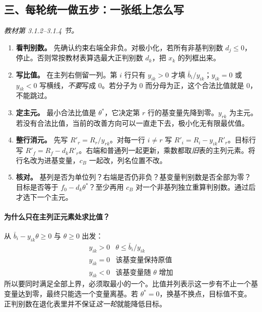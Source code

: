 \documentclass[UTF8,11pt,a4paper]{ctexart}
\begin{document}
\clearpage
\subsection*{三、每轮统一做五步：一张纸上怎么写}
\noindent\textit{教材第 3.1.2--3.1.4 节。}
\begin{enumerate}
\item \textbf{看判别数。} 先确认约束右端全非负。对极小化，若所有非基判别数 $d_j\le0$，停止。否则常按教材表算选最大正判别数 $d_k$，把 $x_k$ 的列框出来。
\item \textbf{写比值。} 在主列右侧留一列。第 $i$ 行只有 $y_{ik}>0$ 才填 $\bar b_i/y_{ik}$；$y_{ik}=0$ 或 $y_{ik}<0$ 写横线，\emph{不要}写成 0。若分子为 0 而分母为正，这个合法比值就是 0，不能跳过。
\item \textbf{定主元。} 最小合法比值是 $\theta^*$，它决定第 $r$ 行的基变量先降到零。$y_{rk}$ 为主元。若没有合法比值，当前的改善方向可以一直走下去，极小化无有限最优值。
\item \textbf{整行消元。} 先写 $R'_r=R_r/y_{rk}$。对每一行 $i\ne r$ 写 $R'_i=R_i-y_{ik}R'_r$。目标行写 $R'_f=R_f-d_k R'_r$。右端和普通列一起更新，乘数都取\emph{旧}表的主列元素。将行名改为进基变量，$c_B$ 一起改，列名位置不改。
\item \textbf{核对。} 基列是否为单位列？右端是否仍非负？基变量判别数是否全部为零？目标是否等于 $f_0-d_k\theta^*$？至少再用 $c_B$ 对一个非基列独立重算判别数。通过后才选下一个主元。
\end{enumerate}

\paragraph{为什么只在主列正元素处求比值？}
从 $\bar b_i-y_{ik}\theta\ge0$ 与 $\theta\ge0$ 出发：
\[
\begin{array}{c|l}
 y_{ik}>0 & \theta\le \bar b_i/y_{ik}\\
 y_{ik}=0 & \text{该基变量保持原值}\\
 y_{ik}<0 & \text{该基变量随 }\theta\text{ 增加}
\end{array}
\]
所以要同时满足全部上界，必须取最小的一个。比值并列表示这一步有不止一个基变量达到零，最终只能选一个变量离基。若 $\theta^*=0$，换基不换点，目标值不变。正判别数在退化表里并不保证\emph{这一轮}就能降低目标。
\end{document}
